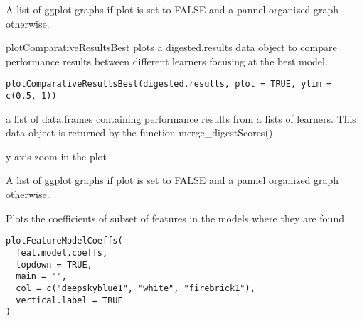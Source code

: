 \documentclass[a4paper]{book}
\begin{document}
%
\begin{Value}
A list of ggplot graphs if plot is set to FALSE and a pannel organized graph otherwise.
\end{Value}
%
\begin{Description}
plotComparativeResultsBest plots a digested.results data object to compare performance results between different learners focusing at the best model.
\end{Description}
%
\begin{Usage}
\begin{verbatim}
plotComparativeResultsBest(digested.results, plot = TRUE, ylim = c(0.5, 1))
\end{verbatim}
\end{Usage}
%
\begin{Arguments}
\begin{ldescription}
\item[\code{digested.results:}] a list of data.frames containing performance results from a lists of learners. This data object is returned by the function merge\_digestScores()

\item[\code{ylim:}] y-axis zoom in the plot
\end{ldescription}
\end{Arguments}
%
\begin{Value}
A list of ggplot graphs if plot is set to FALSE and a pannel organized graph otherwise.
\end{Value}
%
\begin{Description}
Plots the coefficients of subset of features in the models where they are found
\end{Description}
%
\begin{Usage}
\begin{verbatim}
plotFeatureModelCoeffs(
  feat.model.coeffs,
  topdown = TRUE,
  main = "",
  col = c("deepskyblue1", "white", "firebrick1"),
  vertical.label = TRUE
)
\end{verbatim}
\end{Usage}
%
\end{document}

